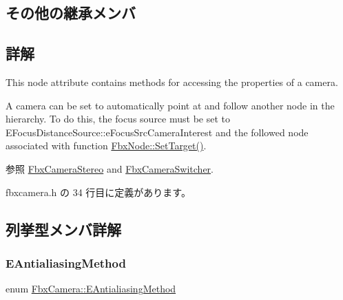 \subsection*{その他の継承メンバ}


\subsection{詳解}
This node attribute contains methods for accessing the properties of a camera.

A camera can be set to automatically point at and follow another node in the hierarchy. To do this, the focus source must be set to E\+Focus\+Distance\+Source\+::e\+Focus\+Src\+Camera\+Interest and the followed node associated with function \hyperlink{class_fbx_node_af421a29f73f7de9f52061c2661569f16}{Fbx\+Node\+::\+Set\+Target()}. \begin{DoxySeeAlso}{参照}
\hyperlink{class_fbx_camera_stereo}{Fbx\+Camera\+Stereo} and \hyperlink{class_fbx_camera_switcher}{Fbx\+Camera\+Switcher}. 
\end{DoxySeeAlso}


 fbxcamera.\+h の 34 行目に定義があります。



\subsection{列挙型メンバ詳解}
\mbox{\label{class_fbx_camera_a44949ea304940f214a2f23a66dcbf45f}} 
\subsubsection{\texorpdfstring{E\+Antialiasing\+Method}{EAntialiasingMethod}}
{\footnotesize\ttfamily enum \hyperlink{class_fbx_camera_a44949ea304940f214a2f23a66dcbf45f}{Fbx\+Camera\+::\+E\+Antialiasing\+Method}}

